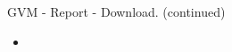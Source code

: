 \begin{frame}[t]{GVM - Report - Download. (continued)}
  \begin{itemize}
    \setlength{\itemsep}{0.12cm}
    \item {}
  \end{itemize}
\end{frame}

